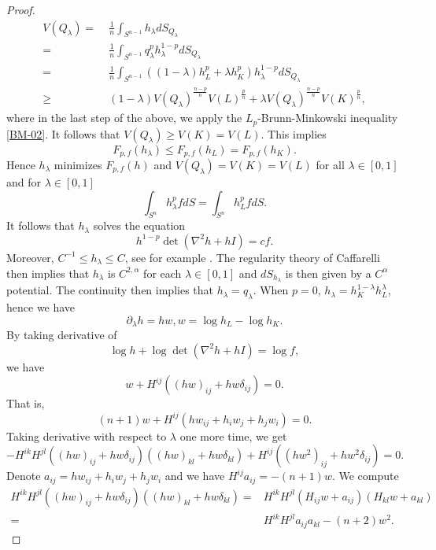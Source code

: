 \documentclass[reqno]{amsart}
\theoremstyle{remark}
\def\p{\partial}
\def\l{\lambda}
\theoremstyle{plain}
\begin{document}
\begin{proof}
\begin{equation}
\begin{split}
     V(Q_\l)=&\;\frac{1}{n}\int_{S^{n-1}} h_\l dS_{Q_\l}\\
     =&\;\frac{1}{n}\int_{S^{n-1}} q_\l^p h_\l^{1-p} dS_{Q_\l}\\
     =&\;\frac{1}{n}\int_{S^{n-1}} ((1-\l) h_L^p+\l h_K^p) h_\l^{1-p} dS_{Q_\l}\\
     \geq &\; (1-\l)V(Q_\l)^{\frac{n-p}{n}} V(L)^{\frac{p}{n}}+\l V(Q_\l)^{\frac{n-p}{n}} V(K)^{\frac{p}{n}},
\end{split}
\end{equation}
where in the last step of the above, we apply the $L_p$-Brunn-Minkowski inequality \eqref{BM-02}. 
It follows that $V(Q_\l)\geq V(K)=V(L)$. This implies 
\[
F_{{p}, f}(h_\l)\leq F_{p, f}(h_L)=F_{p, f}(h_K).
\]
Hence $h_\l$ minimizes $F_{p, f}(h)$ and $V(Q_\l)=V(K)=V(L)$ for all $\l\in [0, 1]$ and for $\lambda\in [0, 1]$
\[
\int_{S^n} h_\lambda^p fdS=\int_{S^n} h_L^pfdS.
\]
It follows that \cite[Lemma 4.1]{BLYZ02} $h_\lambda$ solves the equation 
\[
h^{1-p}\det(\nabla^2 h+h I)=cf.
\]
Moreover, $C^{-1}\leq h_\lambda\leq C$, see for example \cite[Lemma 2.1]{CHLL}. 
The regularity theory of Caffarelli \cite{Caff89, Caff90} then implies that $h_\lambda$ is $C^{2, \alpha}$ for each $\lambda\in [0, 1]$ and $dS_{h_\lambda}$ is then given by a $C^\alpha$ potential.  The continuity then implies that  $h_\lambda=q_\lambda$.  
When $p=0$, $h_\lambda=h_K^{1-\lambda}h_L^\lambda$, hence we have
\[
\p_\lambda h= h w, w=\log h_L-\log h_K.  
\]
By taking derivative of 
\[
\log h+\log \det(\nabla^2 h+hI)=\log f,
\] we have
\begin{equation}
    w+H^{ij}( (hw)_{ij}+hw \delta_{ij})=0.
\end{equation}
That is,
\begin{equation}\label{linear-001}
    (n+1)w+H^{ij}(h w_{ij}+h_iw_j+h_jw_i)=0.
\end{equation}
Taking derivative with respect to $\lambda$ one more time, we get
\begin{equation}
    -H^{ik}H^{jl}( (hw)_{ij}+hw \delta_{ij})( (hw)_{kl}+hw \delta_{kl})+ H^{ij}((hw^2)_{ij}+hw^2\delta_{ij})=0.
\end{equation}
Denote $a_{ij}=hw_{ij}+h_iw_j+h_jw_i$ and we have $H^{ij}a_{ij}=-(n+1)w$.
We compute
\begin{equation}
\begin{split}
     H^{ik}H^{jl}( (hw)_{ij}+hw \delta_{ij})( (hw)_{kl}+hw \delta_{kl})=&H^{ik}H^{jl}(H_{ij}w+a_{ij})(H_{kl}w+a_{kl})\\
     =&H^{ik}H^{jl}a_{ij}a_{kl}-(n+2)w^2.
\end{split}

\end{equation}
\end{proof}
\end{document}

